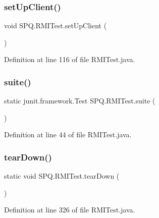 \subsubsection{\texorpdfstring{set\+Up\+Client()}{setUpClient()}}
{\footnotesize\ttfamily void S\+P\+Q.\+R\+M\+I\+Test.\+set\+Up\+Client (\begin{DoxyParamCaption}{ }\end{DoxyParamCaption})}



Definition at line 116 of file R\+M\+I\+Test.\+java.

\mbox{\label{class_s_p_q_1_1_r_m_i_test_a7cc9358271c503f37c8092d93a6ce95c}} 
\subsubsection{\texorpdfstring{suite()}{suite()}}
{\footnotesize\ttfamily static junit.\+framework.\+Test S\+P\+Q.\+R\+M\+I\+Test.\+suite (\begin{DoxyParamCaption}{ }\end{DoxyParamCaption})\hspace{0.3cm}{\ttfamily [static]}}



Definition at line 44 of file R\+M\+I\+Test.\+java.

\mbox{\label{class_s_p_q_1_1_r_m_i_test_a76a8f88205d4a70c8ed81ee03ab7fa45}} 
\subsubsection{\texorpdfstring{tear\+Down()}{tearDown()}}
{\footnotesize\ttfamily static void S\+P\+Q.\+R\+M\+I\+Test.\+tear\+Down (\begin{DoxyParamCaption}{ }\end{DoxyParamCaption})\hspace{0.3cm}{\ttfamily [static]}}



Definition at line 326 of file R\+M\+I\+Test.\+java.

